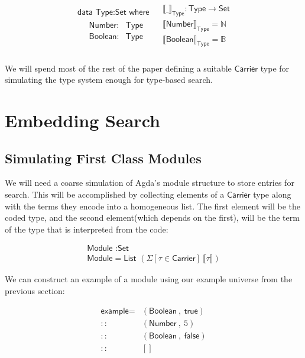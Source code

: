 \documentclass[acmsmall,review,authorversion]{acmart}
\newcommand{\term}[1]{\textsf{#1}}
\newcommand{\type}[1]{\textsf{#1}}
\newcommand{\Carrier}{\term{Carrier}}
\newcommand{\Set}{\type{Set}}
\newcommand{\Type}{\type{Type}}
\newcommand{\Boolean}{\term{Boolean}}
\newcommand{\true}{\term{true}}
\newcommand{\false}{\term{false}}
\newcommand{\Number}{\term{Number}}
\newcommand{\Interp}[1]{\llbracket #1 \rrbracket}
\newcommand{\?}{\stackrel{?}{\approx}}
\newcommand{\data}[2]{\textsf{data } #1 : #2 \textsf{ where}}
\begin{document}
$$
\begin{array}{cc}
\begin{array}{l}
\data{\Type}{\Set}\\
\quad \begin{array}{rl}
        \textsf{Number} :& \Type\\
        \textsf{Boolean} :& \Type\\
      \end{array}
\end{array}
&
\begin{array}{l}
  \Interp{\_}_{\Type} : \Type \rightarrow \Set\\
  \Interp{\textsf{Number}}_{\Type}     = \mathbb{N}\\
  \Interp{\textsf{Boolean}}_{\Type}    = \mathbb{B}\\
\end{array}
\end{array}
$$

We will spend most of the rest of the paper defining a suitable $\Carrier$ type
for simulating the type system enough for type-based search.


\section{Embedding Search}

\subsection{Simulating First Class Modules}

We will need a coarse simulation of Agda's module structure to store entries for
search. This will be accomplished by collecting elements of a $\Carrier$ type
along with the terms they encode into a homogeneous list. The first element will
be the coded type, and the second element(which depends on the first), will be
the term of the type that is interpreted from the code:

$$
\begin{array}{l}
\textsf{Module } : \Set\\
\textsf{Module} = \textsf{List } (\Sigma[ \tau \in \Carrier ]\ \Interp{ \tau })
\end{array}
$$

We can construct an example of a module using our example universe from the
previous section:

$$
\begin{array}{rl}
  \textsf{example} =& (\Boolean\ ,\ \true)\\
                  ::& (\Number\ ,\ 5 )\\
                  ::& (\Boolean\ ,\ \false )\\
                  ::&[]
\end{array}
$$
\end{document}
